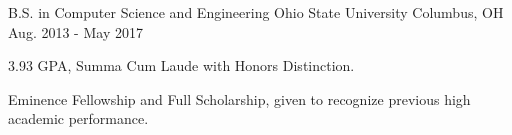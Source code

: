 

\begin{cventries}

  \cventry
    {B.S. in Computer Science and Engineering} %
    {Ohio State University} %
    {Columbus, OH} %
    {Aug. 2013 - May 2017} %
    {
      \begin{cvitems} %
        \item {3.93 GPA, Summa Cum Laude with Honors Distinction.}
        \item {Eminence Fellowship and Full Scholarship, given to recognize previous high academic performance.}
      \end{cvitems}
    }

\end{cventries}
